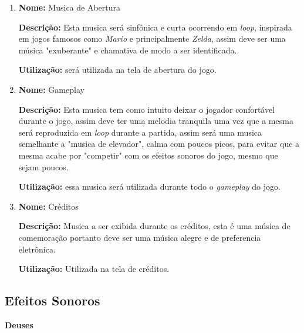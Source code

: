 \documentclass[11pt]{article} %
\begin{document}
\begin{enumerate}
\item 
\textbf{Nome:} Musica de Abertura

\textbf{Descrição:} Esta musica será sinfônica e curta ocorrendo em \textit{loop}, inspirada em jogos famosos como \textit{Mario} e principalmente \textit{Zelda}, assim deve ser uma música "exuberante" e chamativa de modo a ser identificada.

\textbf{Utilização:} será utilizada na tela de abertura do jogo.

\item
\textbf{Nome:} Gameplay

\textbf{Descrição:} Esta musica tem como intuito deixar o jogador confortável durante o jogo, assim deve ter uma melodia tranquila uma vez que a mesma será reproduzida em \textit{loop} durante a partida, assim será uma musica semelhante a "musica de elevador", calma com poucos picos, para evitar que a mesma acabe por "competir" com os efeitos sonoros do jogo, mesmo que sejam poucos.  

\textbf{Utilização:} essa musica será utilizada durante todo o \textit{gameplay} do jogo.

\item
\textbf{Nome:} Créditos

\textbf{Descrição:} Musica a ser exibida durante os créditos, esta é uma música de comemoração portanto deve ser uma música alegre e de preferencia eletrônica. 

\textbf{Utilização:} Utilizada na tela de créditos.
\end{enumerate}

\subsection{Efeitos Sonoros}
{\LARGE \textbf{Deuses}}
\end{document}
